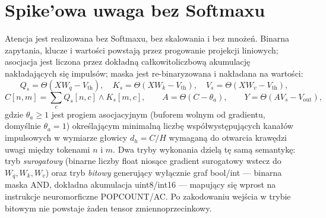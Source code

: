 \documentclass[11pt]{article}
\begin{document}
\section{Spike'owa uwaga bez Softmaxu}
Atencja jest realizowana bez Softmaxu, bez skalowania i bez mnożeń. Binarna
zapytania, klucze i wartości powstają przez progowanie projekcji liniowych;
asocjacja jest liczona przez dokładną całkowitoliczbową akumulację
nakładających się impulsów; maska jest re-binaryzowana i nakładana na
wartości:
\begin{equation}
Q_s = \Theta(X W_q - V_{\text{th}}),\quad
K_s = \Theta(X W_k - V_{\text{th}}),\quad
V_s = \Theta(X W_v - V_{\text{th}}),
\end{equation}
\begin{equation}
C[n,m] = \sum_c Q_s[n,c] \wedge K_s[m,c], \qquad
A = \Theta(C - \theta_a), \qquad
Y = \Theta(A V_s - V_{\text{out}}),
\end{equation}
gdzie $\theta_a \ge 1$ jest progiem asocjacyjnym (buforem wolnym od gradientu, domyślnie $\theta_a = 1$) określającym minimalną liczbę współwystępujących kanałów impulsowych w wymiarze głowicy $d_h = C/H$ wymaganą do otwarcia krawędzi uwagi między tokenami $n$ i $m$.
Dwa tryby wykonania dzielą tę samą semantykę: tryb \emph{surogatowy}
(binarne liczby float niosące gradient surogatowy wstecz do $W_q,W_k,W_v$)
oraz tryb \emph{bitowy} generujący wyłącznie graf bool/int --- binarna maska
AND, dokładna akumulacja uint8/int16 --- mapujący się wprost na instrukcje
neuromorficzne POPCOUNT/AC. Po zakodowaniu wejścia w trybie bitowym
nie powstaje żaden tensor zmiennoprzecinkowy.
\end{document}
